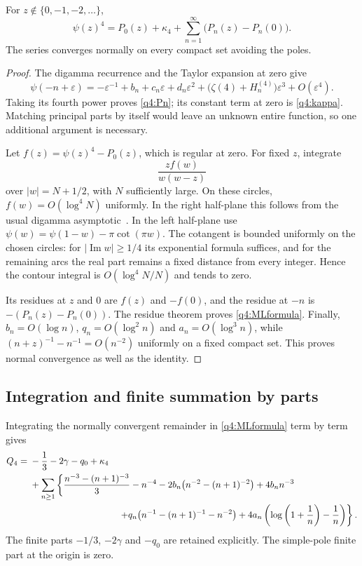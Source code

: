 \begin{lemma}\label{q4:ML}
For $z\notin\{0,-1,-2,\ldots\}$,
\begin{equation}\label{q4:MLformula}
 \psi(z)^4=P_0(z)+\kappa_4+
                   \sum_{n=1}^{\infty}\bigl(P_n(z)-P_n(0)\bigr).
\end{equation}
The series converges normally on every compact set avoiding the poles.
\end{lemma}

\begin{proof}
The digamma recurrence and the Taylor expansion at zero
\cite[Sections~5.5, 5.7]{DLMF} give
\[
 \psi(-n+\varepsilon)=-\varepsilon^{-1}+b_n+c_n\varepsilon
           +d_n\varepsilon^2
           +\bigl(\zeta(4)+H_n^{(4)}\bigr)\varepsilon^3
           +O(\varepsilon^4).
\]
Taking its fourth power proves \eqref{q4:Pn}; its constant term at zero
is \eqref{q4:kappa}.  Matching principal parts by itself would leave an
unknown entire function, so one additional argument is necessary.

Let $f(z)=\psi(z)^4-P_0(z)$, which is regular at zero.  For fixed $z$,
integrate
\[
 \frac{z f(w)}{w(w-z)}
\]
over $|w|=N+1/2$, with $N$ sufficiently large.  On these circles,
$f(w)=O(\log^4N)$ uniformly.  In the right half-plane this follows from
the usual digamma asymptotic~\cite[Section~5.11]{DLMF}.
In the left half-plane use
$\psi(w)=\psi(1-w)-\pi\cot(\pi w)$.  The cotangent is bounded uniformly
on the chosen circles: for $|\operatorname{Im}w|\geq1/4$ its exponential
formula suffices, and for the remaining arcs the real part remains a
fixed distance from every integer.  Hence the contour integral is
$O(\log^4N/N)$ and tends to zero.

Its residues at $z$ and $0$ are $f(z)$ and $-f(0)$, and the residue at
$-n$ is $-(P_n(z)-P_n(0))$.  The residue theorem proves
\eqref{q4:MLformula}.  Finally,
$b_n=O(\log n)$, $q_n=O(\log^2n)$ and $a_n=O(\log^3n)$, while
$(n+z)^{-1}-n^{-1}=O(n^{-2})$ uniformly on a fixed compact set.
This proves normal convergence as well as the identity.
\end{proof}

\subsection{Integration and finite summation by parts}

Integrating the normally convergent remainder in \eqref{q4:MLformula}
term by term gives
\begin{align}\label{q4:integrated}
 Q_4={}&-\frac13-2\gamma-q_0+\kappa_4\notag\\
 &+\sum_{n\geq1}\left\{
   \frac{n^{-3}-(n+1)^{-3}}3-n^{-4}
   -2b_n\bigl(n^{-2}-(n+1)^{-2}\bigr)+4b_nn^{-3}\right.\notag\\
 &\hspace{34mm}\left.
   +q_n\bigl(n^{-1}-(n+1)^{-1}-n^{-2}\bigr)
   +4a_n\left(\log\left(1+\frac1n\right)-\frac1n\right)
  \right\}.
\end{align}
The finite parts $-1/3$, $-2\gamma$ and $-q_0$ are retained explicitly.
The simple-pole finite part at the origin is zero.

